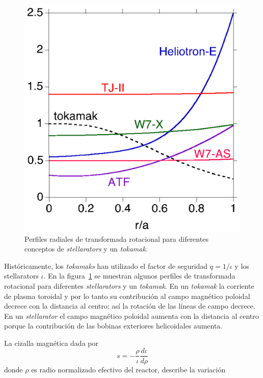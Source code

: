 \begin{figure}
    \centering
    \includegraphics[scale=0.5]{img/compare.png}
    \caption[Perfiles radiales de transformada rotacional]{Perfiles radiales de transformada rotacional para diferentes
    conceptos de \textit{stellarators} y un \textit{tokamak}.}
    \label{fig:compare}
\end{figure}
Históricamente, los \textit{tokamaks} han utilizado el factor de seguridad $q=1/\iota$ y los stellarators $\iota$. En la figura~\ref{fig:compare} se muestran algunos perfiles de
transformada rotacional para diferentes \textit{stellarators} y un \textit{tokamak}. En un
\textit{tokamak} la corriente de plasma toroidal y por lo tanto su contribución al 
campo magnético poloidal decrece con la distancia al centro; así la rotación
de las líneas de campo decrece. En un \textit{stellarator} el campo magnético poloidal
aumenta con la distancia al centro porque la contribución de las bobinas
exteriores helicoidales aumenta.\par
La cizalla magnética dada por 
\begin{equation}\label{eq:cizalla}
    s=-\frac{\rho}{\iota}\frac{d\iota}{d\rho}
\end{equation}
donde $\rho$ es radio normalizado efectivo del reactor, describe la variación
